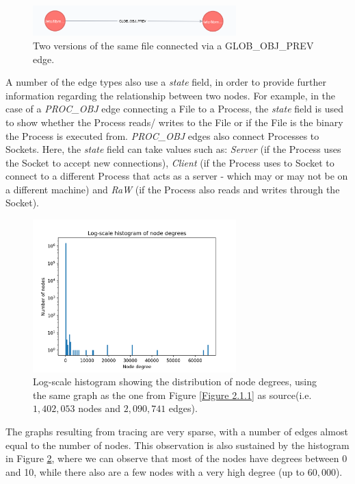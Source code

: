 	\begin{figure}[H]
		\centering
		\label{Figure 2.1.2}
		\includegraphics[width=0.7\textwidth]{graphics/GLOB_OBJ_PREV}
		\caption{
			Two versions of the same file connected via a GLOB\_OBJ\_PREV edge.
		}
	\end{figure}
	A number of the edge types also use a \textit{state} field, in order to provide further information regarding the relationship between two nodes. For example, in the case of a \textit{PROC\_OBJ} edge connecting a File to a Process, the \textit{state} field is used to show whether the Process reads/ writes to the File or if the File is the binary the Process is executed from. \textit{PROC\_OBJ} edges also connect Processes to Sockets. Here, the \textit{state} field can take values such as: \textit{Server} (if the Process uses the Socket to accept new connections), \textit{Client} (if the Process uses to Socket to connect to a different Process that acts as a server - which may or may not be on a different machine)  and \textit{RaW} (if the Process also reads and writes through the Socket).
	\begin{figure}[H]
		\centering
		\label{Figure 2.1.3}
		\includegraphics[width=0.7\textwidth]{graphics/node_degree_hist}
		\caption[Log-scale distribution of node degrees]{
			Log-scale histogram showing the distribution of node degrees, using the same graph as the one from Figure \ref{Figure 2.1.1} as source(i.e. $1,402,053$ nodes and $2,090,741$ edges).
		}
	\end{figure}
	 
	 The graphs resulting from tracing are very sparse, with a number of edges almost equal to the number of nodes. This observation is also sustained by the histogram in Figure \ref{Figure 2.1.3}, where we can observe that most of the nodes have degrees between 0 and 10, while there also are a few nodes with a very high degree (up to $60, 000$).
	 
